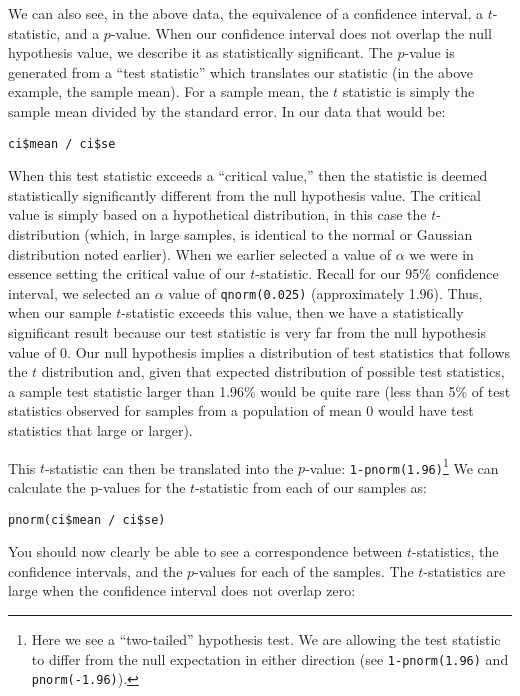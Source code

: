 \documentclass[a4paper,12pt]{article}
\begin{document}
\begin{enumerate*}
\item We can also see, in the above data, the equivalence of a confidence interval, a $t$-statistic, and a $p$-value. When our confidence interval does not overlap the null hypothesis value, we describe it as statistically significant. The $p$-value is generated from a ``test statistic'' which translates our statistic (in the above example, the sample mean). For a sample mean, the $t$ statistic is simply the sample mean divided by the standard error. In our data that would be:

\begin{verbatim}
ci$mean / ci$se
\end{verbatim}

\noindent When this test statistic exceeds a ``critical value,'' then the statistic is deemed statistically significantly different from the null hypothesis value. The critical value is simply based on a hypothetical distribution, in this case the $t$-distribution (which, in large samples, is identical to the normal or Gaussian distribution noted earlier). When we earlier selected a value of $\alpha$ we were in essence setting the critical value of our $t$-statistic. Recall for our 95\% confidence interval, we selected an $\alpha$ value of \texttt{qnorm(0.025)} (approximately 1.96). Thus, when our sample $t$-statistic exceeds this value, then we have a statistically significant result because our test statistic is very far from the null hypothesis value of 0. Our null hypothesis implies a distribution of test statistics that follows the $t$ distribution and, given that expected distribution of possible test statistics, a sample test statistic larger than 1.96\% would be quite rare (less than 5\% of test statistics observed for samples from a population of mean 0 would have test statistics that large or larger).

\item This $t$-statistic can then be translated into the $p$-value: \texttt{1-pnorm(1.96)}\footnote{Here we see a ``two-tailed'' hypothesis test. We are allowing the test statistic to differ from the null expectation in either direction (see \texttt{1-pnorm(1.96)} and \texttt{pnorm(-1.96)}).} We can calculate the p-values for the $t$-statistic from each of our samples as:

\begin{verbatim}
pnorm(ci$mean / ci$se)
\end{verbatim}

\noindent You should now clearly be able to see a correspondence between $t$-statistics, the confidence intervals, and the $p$-values for each of the samples. The $t$-statistics are large when the confidence interval does not overlap zero:


\end{enumerate*}
\end{document}
